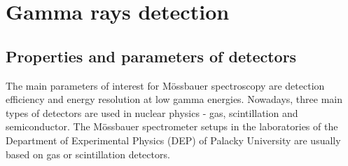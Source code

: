
\chapter{Gamma rays detection}


\section{Properties and parameters of detectors}
The main parameters of interest for Mössbauer spectroscopy are detection efficiency and energy resolution at low gamma energies. Nowadays, three main types of detectors are used in nuclear physics - gas, scintillation and semiconductor. The Mössbauer spectrometer setups in the laboratories of the Department of Experimental Physics (DEP) of Palacky University are usually based on gas or scintillation detectors.


